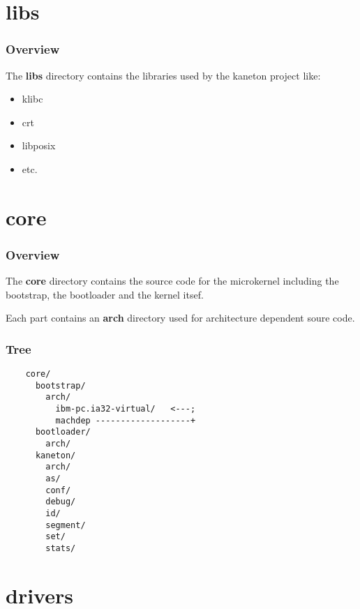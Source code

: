 %
%

\section{libs}


\begin{frame}
  \frametitle{Overview}

  The \textbf{libs} directory contains the libraries used by the kaneton
  project like:

  \begin{itemize}
    \item
      klibc
    \item
      crt
    \item
      libposix
    \item
      etc.
  \end{itemize}
\end{frame}

%
%

\section{core}


\begin{frame}
  \frametitle{Overview}

  The \textbf{core} directory contains the source code for the microkernel
  including the bootstrap, the bootloader and the kernel itsef.

  \nl

  Each part contains an \textbf{arch} directory used for architecture
  dependent soure code.
\end{frame}


\begin{frame}[containsverbatim]
  \frametitle{Tree}

  \begin{verbatim}
    core/
      bootstrap/
        arch/
          ibm-pc.ia32-virtual/   <---;
          machdep -------------------+
      bootloader/
        arch/
      kaneton/
        arch/
        as/
        conf/
        debug/
        id/
        segment/
        set/
        stats/
  \end{verbatim}
\end{frame}

%
%

\section{drivers}

